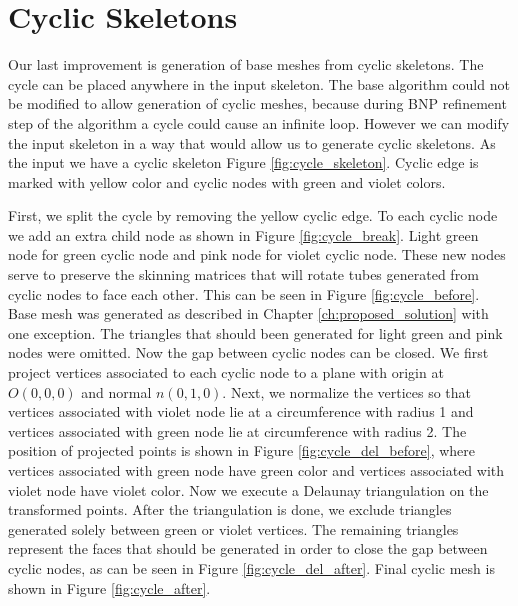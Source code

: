 \section{Cyclic Skeletons}
Our last improvement is generation of base meshes from cyclic skeletons.
The cycle can be placed anywhere in the input skeleton.
The base algorithm could not be modified to allow generation of cyclic meshes, because during BNP refinement step of the algorithm a cycle could cause an infinite loop.
However we can modify the input skeleton in a way that would allow us to generate cyclic skeletons.
As the input we have a cyclic skeleton Figure \ref{fig:cycle_skeleton}.
Cyclic edge is marked with yellow color and cyclic nodes with green and violet colors.

First, we split the cycle by removing the yellow cyclic edge.
To each cyclic node we add an extra child node as shown in Figure \ref{fig:cycle_break}.
Light green node for green cyclic node and pink node for violet cyclic node.
These new nodes serve to preserve the skinning matrices that will rotate tubes generated from cyclic nodes to face each other. This can be seen in Figure \ref{fig:cycle_before}. Base mesh was generated as described in Chapter \ref{ch:proposed_solution} with one exception.
The triangles that should been generated for light green and pink nodes were omitted.
Now the gap between cyclic nodes can be closed.
We first project vertices associated to each cyclic node to a plane with origin at $O(0, 0, 0)$ and normal $n(0, 1, 0)$.
Next, we normalize the vertices so that vertices associated with violet node lie at a circumference with radius 1 and vertices associated with green node lie at circumference with radius 2.
The position of projected points is shown in Figure \ref{fig:cycle_del_before}, where vertices associated with green node have green color and vertices associated with violet node have violet color.
Now we execute a Delaunay triangulation on the transformed points.
After the triangulation is done, we exclude triangles generated solely between green or violet vertices.
The remaining triangles represent the faces that should be generated in order to close the gap between cyclic nodes, as can be seen in Figure \ref{fig:cycle_del_after}.
Final cyclic mesh is shown in Figure \ref{fig:cycle_after}.

